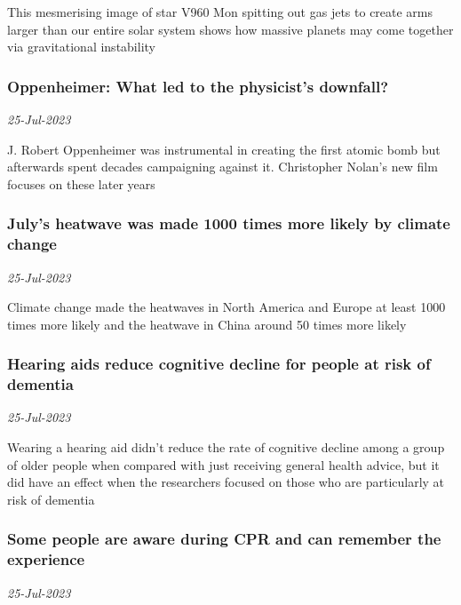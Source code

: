 This mesmerising image of star V960 Mon spitting out gas jets to create arms larger than our entire solar system shows how massive planets may come together via gravitational instability
\subsubsection{Oppenheimer: What led to the physicist's downfall? \href{https://www.newscientist.com/article/2384144-oppenheimer-what-led-to-the-physicists-downfall/?utm_campaign=RSS%7CNSNS&utm_source=NSNS&utm_medium=RSS&utm_content=home}{\ding{225}}}
\textit{25-Jul-2023}

J. Robert Oppenheimer was instrumental in creating the first atomic bomb but afterwards spent decades campaigning against it. Christopher Nolan’s new film focuses on these later years
\subsubsection{July’s heatwave was made 1000 times more likely by climate change \href{https://www.newscientist.com/article/2384130-julys-heatwave-was-made-1000-times-more-likely-by-climate-change/?utm_campaign=RSS%7CNSNS&utm_source=NSNS&utm_medium=RSS&utm_content=home}{}}
\textit{25-Jul-2023}

Climate change made the heatwaves in North America and Europe at least 1000 times more likely and the heatwave in China around 50 times more likely
\subsubsection{Hearing aids reduce cognitive decline for people at risk of dementia \href{https://www.newscientist.com/article/2383792-hearing-aids-reduce-cognitive-decline-for-people-at-risk-of-dementia/?utm_campaign=RSS%7CNSNS&utm_source=NSNS&utm_medium=RSS&utm_content=home}{\ding{225}}}
\textit{25-Jul-2023}

Wearing a hearing aid didn't reduce the rate of cognitive decline among a group of older people when compared with just receiving general health advice, but it did have an effect when the researchers focused on those who are particularly at risk of dementia
\subsubsection{Some people are aware during CPR and can remember the experience \href{https://www.newscientist.com/article/2383847-some-people-are-aware-during-cpr-and-can-remember-the-experience/?utm_campaign=RSS%7CNSNS&utm_source=NSNS&utm_medium=RSS&utm_content=home}{}}
\textit{25-Jul-2023}

